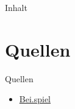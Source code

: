 \documentclass[compress]{beamer}
\title{}
\author{Justus Klameth}
\institute{Joseph-König-Gymnasium}
\begin{document}
    \frame{\titlepage}

    \begin{frame}{Inhalt}
        \tableofcontents
    \end{frame}

    \section*{Quellen}

    \begin{frame}{Quellen}
        
        \begin{itemize}
            \item \url{Bei.spiel}
        \end{itemize}

    \end{frame}
\end{document}
